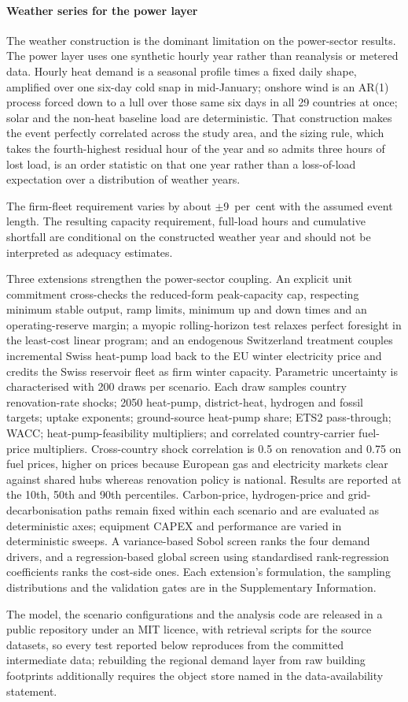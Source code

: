 \paragraph{Weather series for the power layer}
The weather construction is the dominant limitation on the power-sector results. The
power layer uses one synthetic hourly year rather than reanalysis or metered data.
Hourly heat demand is a seasonal profile
times a fixed daily shape, amplified over one six-day cold snap in mid-January; onshore
wind is an AR(1) process forced down to a lull over those same six days in all 29
countries at once; solar and the non-heat baseline load are deterministic. That
construction makes the event perfectly correlated across the study area, and the sizing
rule, which takes the fourth-highest residual hour of the year and so admits three hours
of lost load, is an order statistic on that one year rather than a loss-of-load
expectation over a distribution of weather years.

The firm-fleet requirement varies by about $\pm$9~per~cent with the assumed event length.
The resulting capacity requirement, full-load hours and cumulative shortfall are
conditional on the constructed weather year and should not be interpreted as adequacy
estimates.

Three extensions strengthen the power-sector coupling. An explicit unit commitment
cross-checks the reduced-form peak-capacity cap, respecting minimum stable output, ramp
limits, minimum up and down times and an operating-reserve margin; a myopic
rolling-horizon test relaxes perfect foresight in the least-cost linear program; and an
endogenous Switzerland treatment couples incremental Swiss heat-pump load back to the EU
winter electricity price and credits the Swiss reservoir fleet as firm winter capacity.
Parametric uncertainty is characterised with 200 draws per scenario. Each draw samples country renovation-rate shocks; 2050 heat-pump, district-heat, hydrogen and fossil targets; uptake exponents; ground-source heat-pump share; ETS2 pass-through; WACC; heat-pump-feasibility multipliers; and correlated country-carrier fuel-price multipliers. Cross-country shock correlation is 0.5 on renovation and 0.75 on fuel prices, higher on prices because European gas and electricity markets clear against shared hubs whereas renovation policy is national. Results are reported at the 10th, 50th and 90th percentiles. Carbon-price, hydrogen-price and grid-decarbonisation paths remain fixed within each scenario and are evaluated as deterministic axes; equipment CAPEX and performance are varied in deterministic sweeps. A variance-based Sobol screen ranks the four demand drivers, and a regression-based global screen using standardised rank-regression coefficients ranks the cost-side ones. Each extension's formulation, the sampling distributions and the
validation gates are in the Supplementary Information.

The model, the scenario configurations and the analysis code are released in a public
repository under an MIT licence, with retrieval scripts for the source datasets, so
every test reported below reproduces from the committed intermediate data; rebuilding
the regional demand layer from raw building footprints additionally requires the object
store named in the data-availability statement.
